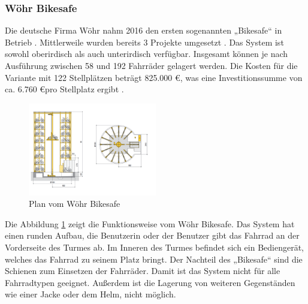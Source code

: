 \subsubsection{Wöhr Bikesafe}
Die deutsche Firma Wöhr nahm 2016 den ersten sogenannten „Bikesafe“ in Betrieb . Mittlerweile wurden bereits 3 Projekte umgesetzt . Das System ist sowohl oberirdisch als auch unterirdisch verfügbar. Insgesamt können je nach Ausführung zwischen 58 und 192 Fahrräder gelagert werden. Die Kosten für die Variante mit 122 Stellplätzen beträgt 825.000 \euro, was eine Investitionssumme von ca. 6.760 \euro pro Stellplatz ergibt \cite*{richtpreisangebot}.

\begin{figure}[H]
  \centering
  \includegraphics[width=0.5\textwidth]{images/bikesafe.png}
  \caption{Plan vom Wöhr Bikesafe }
  \label{fig:bikesafe}
\end{figure}

Die Abbildung \ref{fig:bikesafe} zeigt die Funktionsweise vom Wöhr Bikesafe. Das System hat einen runden Aufbau, die Benutzerin oder der Benutzer gibt das Fahrrad an der Vorderseite des Turmes ab. Im Inneren des Turmes befindet sich ein Bediengerät, welches das Fahrrad zu seinem Platz bringt.
\noindent Der Nachteil des „Bikesafe“ sind die Schienen zum Einsetzen der Fahrräder. Damit ist das System nicht für alle Fahrradtypen geeignet. Außerdem ist die Lagerung von weiteren Gegenständen wie einer Jacke oder dem Helm, nicht möglich.
